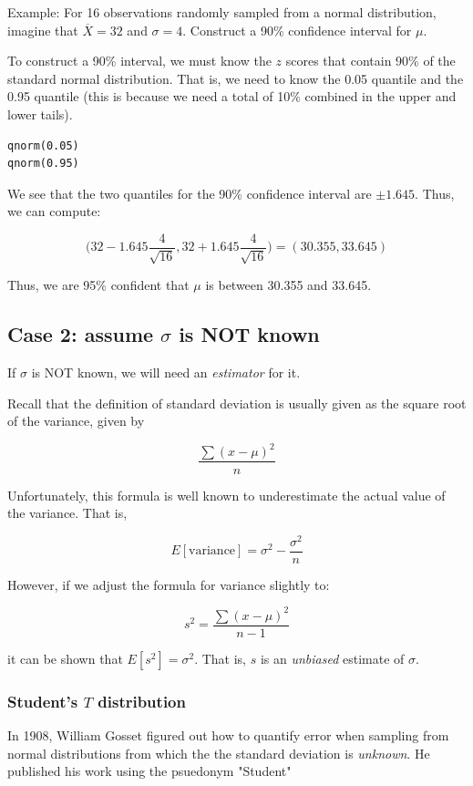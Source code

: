 \documentclass[11pt]{article}
\begin{document}
Example: For 16 observations randomly sampled from a normal distribution, imagine that $\overline{X}=32$ and $\sigma =4$.  Construct a 90\% confidence interval for $\mu$.

To construct a 90\% interval, we must know the $z$ scores that contain 90\% of the standard normal distribution.  That is, we need to know the 0.05 quantile and the 0.95 quantile (this is because we need a total of 10\% combined in the upper and lower tails).

\begin{verbatim}
qnorm(0.05)
qnorm(0.95)
\end{verbatim}

We see that the two quantiles for the 90\% confidence interval are $\pm 1.645$.  Thus, we can compute:

\[
\Biggl(32 - 1.645\frac{4}{\sqrt{16}}, 32 + 1.645\frac{4}{\sqrt{16}}\Biggr) = (30.355, 33.645)
\]

Thus, we are 95\% confident that $\mu$ is between 30.355 and 33.645.


\subsection*{Case 2: assume $\sigma$ is NOT known}
\label{sec-2-2}

If $\sigma$ is NOT known, we will need an \emph{estimator} for it.

Recall that the definition of standard deviation is usually given as the square root of the variance, given by

\[
\frac{\sum (x-\mu)^2}{n}
\]

Unfortunately, this formula is well known to underestimate the actual value of the variance.  That is,

\[
E[\text{variance}] = \sigma^2 - \frac{\sigma^2}{n}
\]

However, if we adjust the formula for variance slightly to:

\[
s^2 = \frac{\sum (x-\mu)^2}{n-1}
\]

it can be shown that $E[s^2] = \sigma^2$.  That is, $s$ is an \emph{unbiased} estimate of $\sigma$.


\subsubsection*{Student's $T$ distribution}
\label{sec-2-2-1}

In 1908, William Gosset figured out how to quantify error when sampling from normal distributions from which the the standard deviation is \emph{unknown}.  He published his work using the psuedonym "Student"
\end{document}
